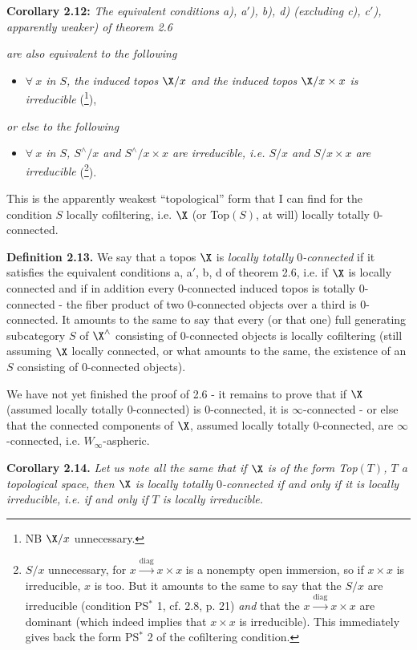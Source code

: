 \textbf{Corollary 2.12:} \textit{The equivalent conditions a), a$'$), b), d) (excluding c), c$'$), apparently weaker) of theorem 2.6}

\textit{are also equivalent to the following}
\begin{itemize}[leftmargin=2.5em]
\item[\textit{e)}] \textit{$\forall\ x$ in $S$, the induced topos $\X/x$ and the induced topos $\X/x\times x$ is irreducible} (\footnote[37]{NB $\X/x$ unnecessary.}),
\end{itemize}
\textit{or else to the following} %
\begin{itemize}[leftmargin=2.5em]
\item[\textit{e$'$)}] \textit{$\forall\ x$ in $S$, $S^\wedge/x$ and $S^\wedge/x{\times}x$ are irreducible, i.e. $S/x$ and $S/x{\times}x$ are irreducible} (\footnote[38]{$S/x$ unnecessary, for $x\xrightarrow{\mathrm{diag}}x\times x$ is a nonempty open immersion, so if $x\times x$ is irreducible, $x$ is too. But it amounts to the same to say that the $S/x$ are irreducible (condition PS$^*$ 1, cf. 2.8, p. 21) \textit{and} that the $x\xrightarrow{\mathrm{diag}}x\times x$ are dominant (which indeed implies that $x\times x$ is irreducible). This immediately gives back the form PS$^*$ 2 of the cofiltering condition. %
}).
\end{itemize}
This is the apparently weakest ``topological'' form that I can find for the condition $S$ locally cofiltering, i.e. $\X$ (or Top$(S)$, at will) locally totally 0-connected.

\textbf{Definition 2.13.} We say that a topos $\X$ is \textit{locally totally} $0$\textit{-connected} if it satisfies the equivalent conditions a, a$'$, b, d of theorem 2.6, i.e. if $\X$ is locally connected and if in addition every 0-connected induced topos is totally 0-connected - the fiber product of two 0-connected objects over a third is 0-connected. It amounts to the same to say that every (or that one) full generating subcategory $S$ of $\X^\wedge$ consisting of 0-connected objects is locally cofiltering (still assuming $\X$ locally connected, or what amounts to the same, the existence of an $S$ consisting of 0-connected objects).

We have not yet finished the proof of 2.6 - it remains to prove that if $\X$ (assumed locally totally 0-connected) is 0-connected, it is $\infty$-connected - or else that the connected components of $\X$, assumed locally totally 0-connected, are $\infty$-connected, i.e. $W_\infty$-aspheric.

\textbf{Corollary 2.14.} \textit{Let us note all the same that if $\X$ is of the form Top$(T)$, $T$ a topological space, then $\X$ is locally totally} $0$\textit{-connected if and only if it is locally irreducible, i.e. if and only if $T$ is locally irreducible.}
